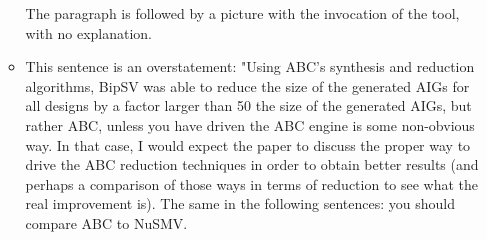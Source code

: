 \begin{itemize}
\begin{itemize}
The paragraph is followed by a picture with the invocation of the tool, with
no explanation.

\item This sentence is an overstatement: "Using ABC’s synthesis and reduction
algorithms, BipSV was able to reduce the size of the generated AIGs for all
designs by a factor larger than 50%
the size of the generated AIGs, but rather ABC, unless you have driven the
ABC engine is some non-obvious way. In that case, I would expect the paper
to discuss the proper way to drive the ABC reduction techniques in order to
obtain better results (and perhaps a comparison of those ways in terms of
reduction to see what the real improvement is). The same in the following
sentences: you should compare ABC to NuSMV.

\end{itemize}
\end{itemize}

















